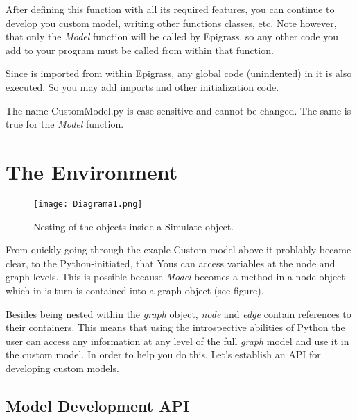 \documentclass[a4paper,10pt]{manual}
\begin{document}
After defining this function with all its required features, you can continue to develop you custom model, writing other functions classes, etc. Note however, that only the \emph{Model} function will be called by Epigrass, so any other code you add to your program must be called from within that function.

\begin{notice}[note]
Since  is imported from within Epigrass, any global code (unindented) in it is also  executed. So you may add imports and other initialization code.
\end{notice}

\begin{notice}[warning]
The name CustomModel.py is case-sensitive and cannot be changed. The same is true for the \emph{Model} function.
\end{notice}


\section{The Environment}
\begin{figure}[htbp]
\centering

\texttt{[image: Diagrama1.png]}
\caption{Nesting of the objects inside a Simulate object.}\end{figure}

From quickly going through the exaple Custom model above it problably became clear, to the Python-initiated, that Yous can access variables at the node and graph levels.  This is possible because \emph{Model} becomes a method in a node object which in is turn is contained into a graph object (see figure).

Besides being nested within the \emph{graph} object, \emph{node} and \emph{edge} contain references to their containers. This means that using the introspective abilities of Python the user can access any information at any level of the full \emph{graph} model and use it in the custom model. In order to help you do this, Let's establish an API for developing custom models.


\subsection{Model Development API}
\end{document}
